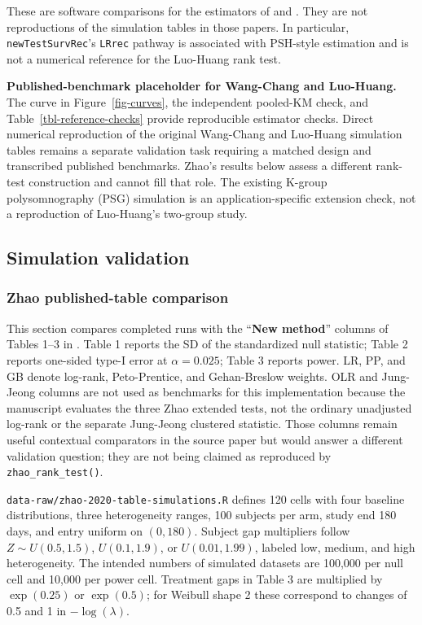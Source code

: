 \documentclass[
  12pt]{article}
\begin{document}
These are software comparisons for the estimators of \citet{wang1999}
and \citet{pena2001}. They are not reproductions of the simulation
tables in those papers. In particular, \texttt{newTestSurvRec}'s
\texttt{LRrec} pathway is associated with PSH-style estimation and is
not a numerical reference for the Luo-Huang rank test.

\textbf{Published-benchmark placeholder for Wang-Chang and Luo-Huang.}
The curve in Figure~\ref{fig-curves}, the independent pooled-KM check,
and Table~\ref{tbl-reference-checks} provide reproducible estimator
checks. Direct numerical reproduction of the original Wang-Chang and
Luo-Huang simulation tables \citep{wang1999, luo2011} remains a separate
validation task requiring a matched design and transcribed published
benchmarks. Zhao's results below assess a different rank-test
construction and cannot fill that role. The existing K-group
polysomnography (PSG) simulation is an application-specific extension
check, not a reproduction of Luo-Huang's two-group study.

\subsection{Simulation validation}\label{simulation-validation}

\subsubsection{Zhao published-table
comparison}\label{sec-zhao-validation}

This section compares completed runs with the ``\textbf{New method}''
columns of Tables 1--3 in \citet{zhao2020}. Table 1 reports the SD of
the standardized null statistic; Table 2 reports one-sided type-I error
at \(\alpha=0.025\); Table 3 reports power. LR, PP, and GB denote
log-rank, Peto-Prentice, and Gehan-Breslow weights. OLR and Jung-Jeong
columns are not used as benchmarks for this implementation because the
manuscript evaluates the three Zhao extended tests, not the ordinary
unadjusted log-rank or the separate Jung-Jeong clustered statistic.
Those columns remain useful contextual comparators in the source paper
but would answer a different validation question; they are not being
claimed as reproduced by \texttt{zhao\_rank\_test()}.

\texttt{data-raw/zhao-2020-table-simulations.R} defines 120 cells with
four baseline distributions, three heterogeneity ranges, 100 subjects
per arm, study end 180 days, and entry uniform on \((0,180)\). Subject
gap multipliers follow \(Z\sim U(0.5,1.5)\), \(U(0.1,1.9)\), or
\(U(0.01,1.99)\), labeled low, medium, and high heterogeneity. The
intended numbers of simulated datasets are 100,000 per null cell and
10,000 per power cell. Treatment gaps in Table 3 are multiplied by
\(\exp(0.25)\) or \(\exp(0.5)\); for Weibull shape 2 these correspond to
changes of 0.5 and 1 in \(-\log(\lambda)\).
\end{document}
